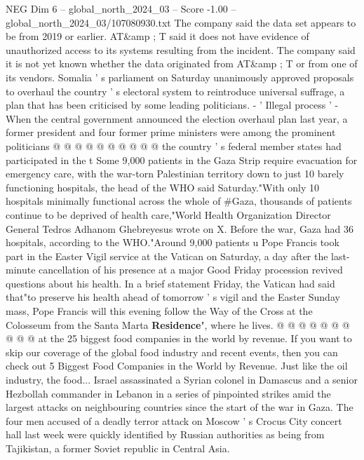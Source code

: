 \begin{textsample}{NEG Dim 6 – global\_north\_2024\_03 – Score -1.00 – global\_north\_2024\_03/107080930.txt}
The company said the data set appears to be from 2019 or earlier.
AT\&amp ; T said it does not have evidence of unauthorized access to its systems resulting from the incident.
The company said it is not yet known whether the data originated from AT\&amp ; T or from one of its vendors.
Somalia ' s parliament on Saturday unanimously approved proposals to overhaul the country ' s electoral system to reintroduce universal suffrage, a plan that has been criticised by some leading politicians. - ' Illegal process ' - When the central government announced the election overhaul plan last year, a former president and four former prime ministers were among the prominent politicians @ @ @ @ @ @ @ @ @ @ the country ' s federal member states had participated in the t Some 9,000 patients in the Gaza Strip require evacuation for emergency care, with the war-torn Palestinian territory down to just 10 barely functioning hospitals, the head of the WHO said Saturday."With only 10 hospitals minimally functional across the whole of \#Gaza, thousands of patients continue to be deprived of health care,"World Health Organization Director General Tedros Adhanom Ghebreyesus wrote on X.
Before the war, Gaza had 36 hospitals, according to the WHO."Around 9,000 patients u Pope Francis took part in the Easter Vigil service at the Vatican on Saturday, a day after the last-minute cancellation of his presence at a major Good Friday procession revived questions about his health.
In a brief statement Friday, the Vatican had said that"to preserve his health ahead of tomorrow ' s vigil and the Easter Sunday mass, Pope Francis will this evening follow the Way of the Cross at the Colosseum from the Santa Marta \textbf{Residence}", where he lives. @ @ @ @ @ @ @ @ @ @ at the 25 biggest food companies in the world by revenue.
If you want to skip our coverage of the global food industry and recent events, then you can check out 5 Biggest Food Companies in the World by Revenue.
Just like the oil industry, the food...
Israel assassinated a Syrian colonel in Damascus and a senior Hezbollah commander in Lebanon in a series of pinpointed strikes amid the largest attacks on neighbouring countries since the start of the war in Gaza.
The four men accused of a deadly terror attack on Moscow ' s Crocus City concert hall last week were quickly identified by Russian authorities as being from Tajikistan, a former Soviet republic in Central Asia.

\end{textsample}
